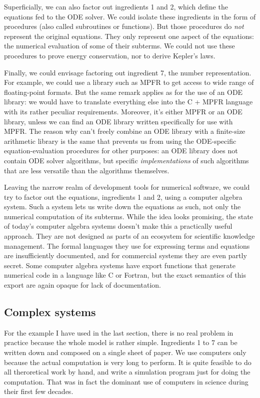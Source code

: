 Superficially, we can also factor out ingredients 1 and 2, which define the equations fed to the ODE solver. We could isolate these ingredients in the form of procedures (also called subroutines or functions). But those procedures do \textit{not} represent the original equations. They only represent one aspect of the equations: the numerical evaluation of some of their subterms. We could not use these procedures to prove energy conservation, nor to derive Kepler's laws.

Finally, we could envisage factoring out ingredient 7, the number representation. For example, we could use a library such as MPFR \cite{fousse_mpfr_2007} to get access to wide range of floating-point formats. But the same remark applies as for the use of an ODE library: we would have to translate everything else into the C + MPFR language with its rather peculiar requirements. Moreover, it's either MPFR or an ODE library, unless we can find an ODE library written specifically for use with MPFR. The reason why can't freely combine an ODE library with a finite-size arithmetic library is the same that prevents us from using the ODE-specific equation-evaluation procedures for other purposes: an ODE library does not contain ODE solver algorithms, but specific \textit{implementations} of such algorithms that are less versatile than the algorithms themselves.

Leaving the narrow realm of development tools for numerical software, we could try to factor out the equations, ingredients 1 and 2, using a computer algebra system. Such a system lets us write down the equations as such, not only the numerical computation of its subterms. While the idea looks promising, the state of today's computer algebra systems doesn't make this a practically useful approach. They are not designed as parts of an ecosystem for scientific knowledge management. The formal languages they use for expressing terms and equations are insufficiently documented, and for commercial systems they are even partly secret. Some computer algebra systems have export functions that generate numerical code in a language like C or Fortran, but the exact semantics of this export are again opaque for lack of documentation.

\subsection{Complex systems}
\label{complex-systems}

For the example I have used in the last section, there is no real problem in practice because the whole model is rather simple. Ingredients 1 to 7 can be written down and composed on a single sheet of paper. We use computers only because the actual computation is very long to perform. It is quite feasible to do all theroretical work by hand, and write a simulation program just for doing the computation. That was in fact the dominant use of computers in science during their first few decades.

